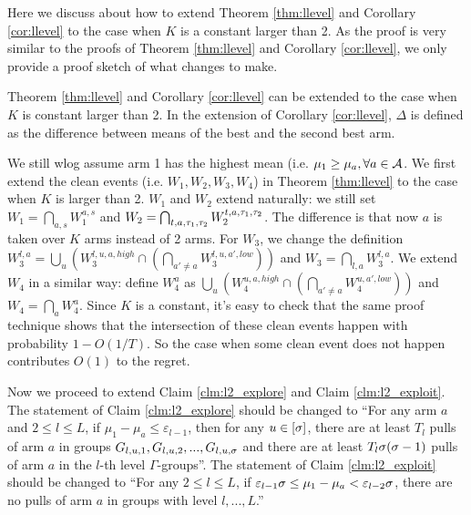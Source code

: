 Here we discuss about how to extend Theorem \ref{thm:llevel} and Corollary \ref{cor:llevel} to the case when $K$ is a constant larger than 2. As the proof is very similar to the proofs of Theorem \ref{thm:llevel} and Corollary \ref{cor:llevel}, we only provide a proof sketch of what changes to make.

\begin{theorem}
\label{thm:constarm}
Theorem \ref{thm:llevel} and Corollary \ref{cor:llevel} can be extended to the case when $K$ is constant larger than 2. In the extension of Corollary \ref{cor:llevel}, $\Delta$ is defined as the difference between means of the best and the second best arm.
\end{theorem}

We still wlog assume arm 1 has the highest mean (i.e. $\mu_1 \geq \mu_a, \forall a \in \mathcal{A}$. We first extend the clean events (i.e. $W_1,W_2,W_3,W_4$) in Theorem \ref{thm:llevel} to the case when $K$ is larger than 2. $W_1$ and $W_2$ extend naturally: we still set $W_1 = \bigcap_{a,s}W_1^{a,s}$ and $W_2 = \bigcap_{t,a,\tau_1,\tau_2} W_2^{t,a,\tau_1,\tau_2}$. The difference is that now $a$ is taken over $K$ arms instead of 2 arms. For $W_3$, we change the definition $W_3^{l,a} = \bigcup_u \left(W_3^{l,u,a,high}  \cap \left(\bigcap_{a' \neq a} W_3^{l,u,a',low}\right) \right)$ and $W_3 = \bigcap_{l,a} W_3^{l,a}$. We extend $W_4$ in a similar way: define $W^{a}_4$ as $\bigcup_u \left(W_4^{u,a,high} \cap \left(\bigcap_{a' \neq a} W_4^{u,a',low}\right) \right)$ and $W_4 = \bigcap_a W^a_4$. Since $K$ is a constant, it's easy to check that the same proof technique shows that the intersection of these clean events happen with probability  $1-O(1/T)$. So the case when some clean event does not happen contributes $O(1)$ to the regret.

Now we proceed to extend Claim \ref{clm:l2_explore} and Claim \ref{clm:l2_exploit}. The statement of Claim \ref{clm:l2_explore} should be changed to ``For any arm $a$ and $2\leq l \leq L$, if $\mu_1 - \mu_a \leq \varepsilon_{l-1}$, then for any $u \in [\sigma]$, there are at least $T_l$ pulls of arm $a$ in groups $G_{l,u,1},G_{l,u,2}, ... ,G_{l,u,\sigma}$ and there are at least $T_l\sigma(\sigma-1)$ pulls of arm $a$ in the $l$-th level $\Gamma$-groups''. The statement of Claim \ref{clm:l2_exploit} should be changed to ``For any $2 \leq l \leq L$, if $\varepsilon_{l-1} \sigma\leq \mu_1 - \mu_a < \varepsilon_{l-2} \sigma$, there are no pulls of arm $a$ in groups with level $l,...,L$.''

